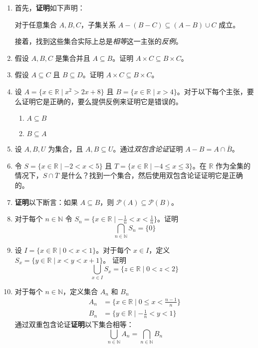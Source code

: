 \begin{enumerate}[label=(\arabic*)]
    \item 首先，\textbf{证明}如下声明：
        \begin{center}
            对于任意集合 $A,B,C$，子集关系 $A - (B - C) \subseteq (A - B) \cup C$ 成立。
        \end{center}
        接着，找到这些集合实际上总是\emph{相等}这一主张的\emph{反例}。
    \item 假设 $A,B,C$ 是集合并且 $A \subseteq B$。证明 $A \times C \subseteq B \times C$。
    \item 假设 $A \subseteq C$ 且 $B \subseteq D$。证明 $A \times C \subseteq B \times C$。
    \item 设 $A = \{x \in \mathbb{R} \mid x^2 > 2x + 8\}$ 且 $B = \{x \in \mathbb{R} \mid x > 4\}$。对于以下每个主张，要么证明它是正确的，要么提供反例来证明它是错误的。
        \begin{enumerate}[label=(\alph*)]
            \item $A \subseteq B$
            \item $B \subseteq A$
        \end{enumerate}
    \item 设 $A, B, U$ 为集合，且 $A, B \subseteq U$。通过\emph{双包含论证}证明 $A - B = A \cap \overline{B}$。
    \item 令 $S = \{x \in \mathbb{R} \mid -2 < x < 5\}$ 且 $T = \{x \in \mathbb{R} \mid -4 \le x \le 3\}$。在 $\mathbb{R}$ 作为全集的情况下，$S \cap \overline{T}$ 是什么？找到一个集合，然后使用双包含论证证明它是正确的。
    \item \textbf{证明}以下断言：如果 $A \subseteq B$，则 $\mathcal{P}(A) \subseteq \mathcal{P}(B)$。\label{exc:exercises3.9.7}
    \item 对于每个 $n \in \mathbb{N}$ 令 $S_n = \{x \in \mathbb{R} \mid -\frac{1}{n} < x < \frac{1}{n}\}$。证明
        \[\bigcap_{n \in \mathbb{N}}S_n = \{0\}\]
    \item 设 $I = \{x \in \mathbb{R} \mid 0 < x < 1\}$。对于每个 $x \in I$，定义 $S_x = \{y \in \mathbb{R} \mid x < y < x + 1\}$。 证明
        \[\bigcup_{x \in I}S_x = \{z \in \mathbb{R} \mid 0 < z < 2\}\]
    \item 对于每个 $n \in \mathbb{N}$，定义集合 $A_n$ 和 $B_n$
        \begin{align*}
            A_n &= \Big\{x \in \mathbb{R} \mid 0 ≤ x < \frac{n - 1}{n}\Big\} \\
            B_n &= \Big\{y \in \mathbb{R} \mid -\frac{1}{n} < y < 1\Big\}
        \end{align*}
        通过双重包含论证\textbf{证明}以下集合相等：
        \[\bigcup_{n \in \mathbb{N}}A_n = \bigcap_{n \in \mathbb{N}}B_n\]
\end{enumerate}
